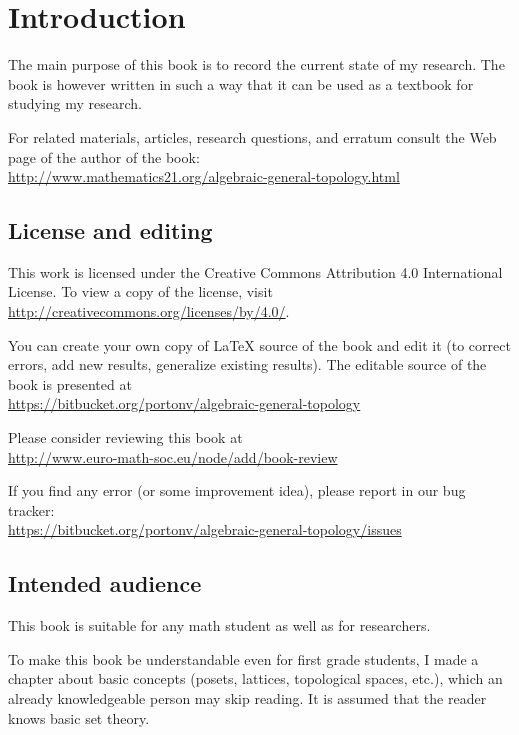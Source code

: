 
\chapter{Introduction}

The main purpose of this book is to record the current state of my
research. The book is however written in such a way that it can be
used as a textbook for studying my research.

For related materials, articles, research questions, and erratum consult
the Web page of the author of the book:\\
\url{http://www.mathematics21.org/algebraic-general-topology.html}


\section{License and editing}

This work is licensed under the Creative Commons Attribution 4.0 International
License. To view a copy of the license, visit\\
\href{http://creativecommons.org/licenses/by/4.0/}{http://creativecommons.org/licenses/by/4.0/}.

You can create your own copy of \LaTeX{} source of the book and edit it (to correct errors, add new results, generalize existing results).
The editable source of the book is presented at\\
\href{https://bitbucket.org/portonv/algebraic-general-topology}{https://bitbucket.org/portonv/algebraic-general-topology}

Please consider reviewing this book at\\
\href{http://www.euro-math-soc.eu/node/add/book-review}{http://www.euro-math-soc.eu/node/add/book-review}

If you find any error (or some improvement idea), please report in our bug tracker:\\
\url{https://bitbucket.org/portonv/algebraic-general-topology/issues}

\section{Intended audience }

This book is suitable for any math student as well as for researchers.

To make this book be understandable even for first grade students,
I made a chapter about basic concepts (posets, lattices, topological
spaces, etc.), which an already knowledgeable person may skip reading.
It is assumed that the reader knows basic set theory.

